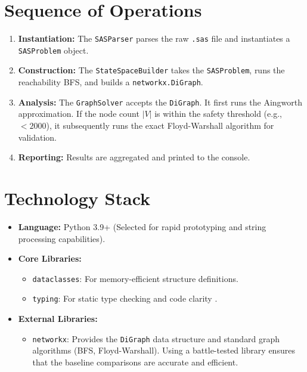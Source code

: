 \documentclass[12pt,a4paper]{report}
\begin{document}
\section{Sequence of Operations}
\begin{enumerate}
    \item \textbf{Instantiation:} The \texttt{SASParser} parses the raw \texttt{.sas} file and instantiates a \texttt{SASProblem} object.
    \item \textbf{Construction:} The \texttt{StateSpaceBuilder} takes the \texttt{SASProblem}, runs the reachability BFS, and builds a \texttt{networkx.DiGraph}.
    \item \textbf{Analysis:} The \texttt{GraphSolver} accepts the \texttt{DiGraph}. It first runs the Aingworth approximation. If the node count $|V|$ is within the safety threshold (e.g., $< 2000$), it subsequently runs the exact Floyd-Warshall algorithm for validation.
    \item \textbf{Reporting:} Results are aggregated and printed to the console.
\end{enumerate}

\section{Technology Stack}
\begin{itemize}
    \item \textbf{Language:} Python 3.9+ (Selected for rapid prototyping and string processing capabilities).
    \item \textbf{Core Libraries:}
    \begin{itemize}
        \item \texttt{dataclasses}: For memory-efficient structure definitions.
        \item \texttt{typing}: For static type checking and code clarity \cite{pythonAST}.
    \end{itemize}
    \item \textbf{External Libraries:}
    \begin{itemize}
        \item \texttt{networkx}: Provides the \texttt{DiGraph} data structure and standard graph algorithms (BFS, Floyd-Warshall). Using a battle-tested library ensures that the baseline comparisons are accurate and efficient.
    \end{itemize}
\end{itemize}
\end{document}
